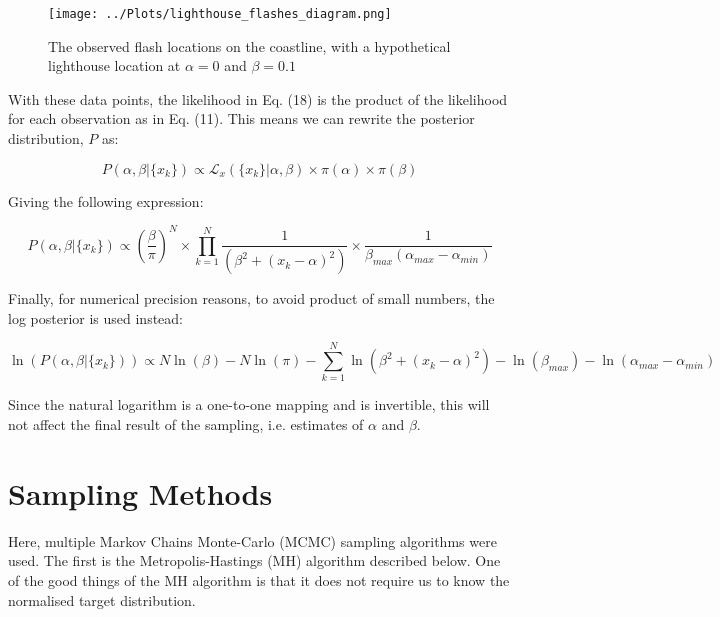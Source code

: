 \documentclass[12pt]{report} %
\begin{document}
\begin{figure}[h]
\centering
\texttt{[image: ../Plots/lighthouse\_flashes\_diagram.png]}
\caption{The observed flash locations on the coastline, with a hypothetical lighthouse location at $\alpha = 0$ and $\beta = 0.1$}
\label{fig:observations}
\end{figure}

\newpage

With these data points, the likelihood in Eq. (18) is the product of the likelihood for each observation as in Eq. (11). This means we can rewrite the posterior distribution, $P$ as:

\begin{equation}
    P(\alpha, \beta | \{x_{k}\}) \propto \mathcal{L}_{x}(\{x_{k}\} | \alpha, \beta) \times \pi(\alpha) \times \pi(\beta)
\end{equation}

Giving the following expression:

\begin{equation}
    P(\alpha, \beta | \{x_{k}\}) \propto (\frac{\beta}{\pi})^{N} \times \prod_{k=1}^{N}\frac{1}{(\beta^{2} + (x_{k} - \alpha)^{2})} \times \frac{1}{\beta_{max}(\alpha_{max} - \alpha_{min})}
\end{equation}

Finally, for numerical precision reasons, to avoid product of small numbers, the log posterior is used instead:

\begin{equation}
    \ln(P(\alpha, \beta | \{x_{k}\})) \propto N\ln(\beta) - N\ln(\pi) - \sum_{k=1}^{N}\ln(\beta^{2} + (x_{k} - \alpha)^{2}) - \ln(\beta_{max}) - \ln(\alpha_{max} - \alpha_{min})
\end{equation}

Since the natural logarithm is a one-to-one mapping and is invertible, this will not affect the final result of the sampling, i.e. estimates of $\alpha$ and $\beta$.

\section{Sampling Methods}

Here, multiple Markov Chains Monte-Carlo (MCMC) sampling algorithms were used. The first is the Metropolis-Hastings (MH) algorithm described below. One of the good things of the MH algorithm is that it does not require us to know the normalised target distribution.
\end{document}
